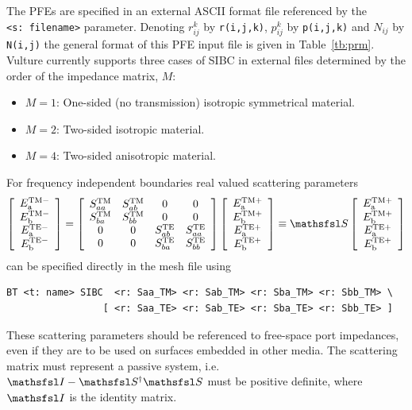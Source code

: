 \documentclass[onecolumn,a4paper]{article}
\numberwithin{equation}{section}
\begin{document}
The PFEs are specified in an external ASCII format file 
referenced by the \texttt{<s:~filename>} parameter. Denoting $r^k_{ij}$ by 
\texttt{r(i,j,k)}, $p^k_{ij}$ by \texttt{p(i,j,k)} and
$N_{ij}$ by \texttt{N(i,j)} the general format of this PFE input file is
given in Table~\ref{tb:prm}. Vulture currently supports three cases of SIBC
in external files determined by the order of the impedance matrix, $M$:
\begin{itemize}
 \item $M=1$: One-sided (no transmission) isotropic symmetrical material.
 \item $M=2$: Two-sided isotropic material.
 \item $M=4$: Two-sided anisotropic material.
\end{itemize}
For frequency independent boundaries real valued scattering
parameters
\begin{eqnarray}
\left[
\begin{array}{c}
E^\mathrm{TM-}_\mathrm{a} \\
E^\mathrm{TM-}_\mathrm{b} \\
E^\mathrm{TE-}_\mathrm{a} \\
E^\mathrm{TE-}_\mathrm{b}
\end{array}
\right]
=
\left[
\begin{array}{cccc}
S^\mathrm{TM}_{aa} &S^\mathrm{TM}_{ab} &0 & 0 \\
S^\mathrm{TM}_{ba} &S^\mathrm{TM}_{bb} &0 & 0 \\
0 & 0 &S^\mathrm{TE}_{ab} &S^\mathrm{TE}_{aa} \\
0 & 0 &S^\mathrm{TE}_{ba} &S^\mathrm{TE}_{bb}
\end{array}
\right]
\left[
\begin{array}{c}
E^\mathrm{TM+}_\mathrm{a} \\
E^\mathrm{TM+}_\mathrm{b} \\
E^\mathrm{TE+}_\mathrm{a} \\
E^\mathrm{TE+}_\mathrm{b}
\end{array}
\right]
\equiv \mS
\left[
\begin{array}{c}
E^\mathrm{TM+}_\mathrm{a} \\
E^\mathrm{TM+}_\mathrm{b} \\
E^\mathrm{TE+}_\mathrm{a} \\
E^\mathrm{TE+}_\mathrm{b}
\end{array}
\right]
\end{eqnarray}
can be specified directly in the mesh file using
\begin{verbatim}
BT <t: name> SIBC  <r: Saa_TM> <r: Sab_TM> <r: Sba_TM> <r: Sbb_TM> \
                 [ <r: Saa_TE> <r: Sab_TE> <r: Sba_TE> <r: Sbb_TE> ]
\end{verbatim}
These scattering parameters should be referenced to free-space port impedances, even
if they are to be used on surfaces embedded in other media. The scattering matrix must
represent a passive system, i.e. $\mI - \mS^\dagger \mS$ must be positive definite,
where $\mI$ is the identity matrix.
\end{document}
